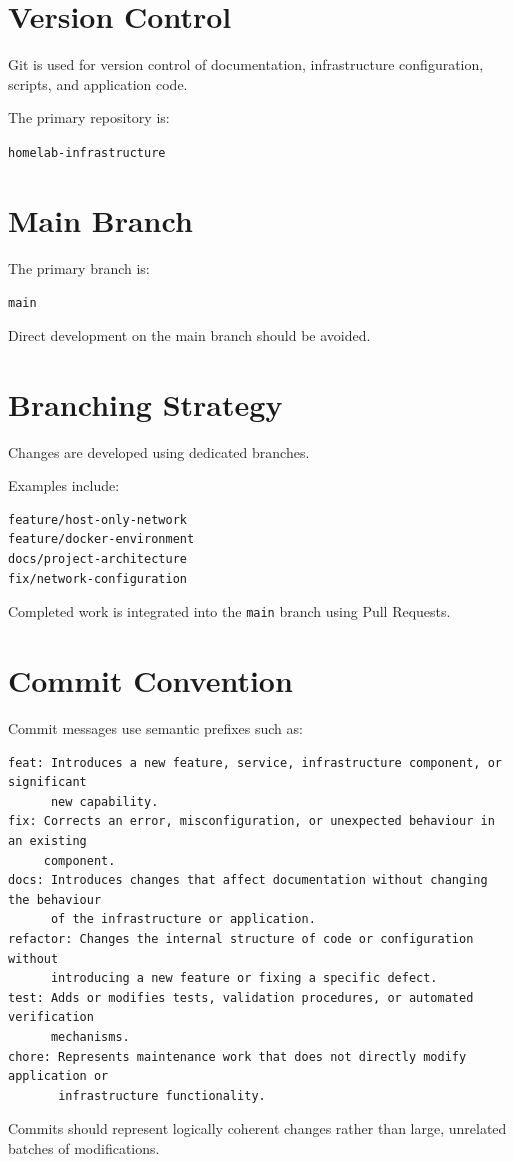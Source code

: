 \section{Version Control}

Git is used for version control of documentation, infrastructure
configuration, scripts, and application code.

The primary repository is:

\begin{center}
\texttt{homelab-infrastructure}
\end{center}

\section{Main Branch}

The primary branch is:

\begin{center}
\texttt{main}
\end{center}

Direct development on the main branch should be avoided.

\section{Branching Strategy}

Changes are developed using dedicated branches.

Examples include:

\begin{verbatim}
feature/host-only-network
feature/docker-environment
docs/project-architecture
fix/network-configuration
\end{verbatim}

Completed work is integrated into the \texttt{main} branch using Pull Requests.

\newpage
\section{Commit Convention}

Commit messages use semantic prefixes such as:

\begin{verbatim}
feat: Introduces a new feature, service, infrastructure component, or significant 
      new capability.
fix: Corrects an error, misconfiguration, or unexpected behaviour in an existing 
     component.
docs: Introduces changes that affect documentation without changing the behaviour 
      of the infrastructure or application.
refactor: Changes the internal structure of code or configuration without 
      introducing a new feature or fixing a specific defect.
test: Adds or modifies tests, validation procedures, or automated verification 
      mechanisms.
chore: Represents maintenance work that does not directly modify application or 
       infrastructure functionality.
\end{verbatim}

Commits should represent logically coherent changes rather than large,
unrelated batches of modifications.